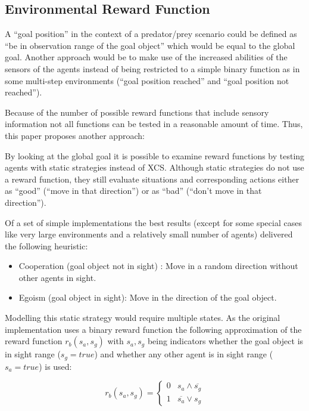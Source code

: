 \subsection{Environmental Reward Function}
\label{subsection:environment-reward-function}

A ``goal position'' in the context of a predator/prey scenario could be defined as ``be in observation range of the goal object'' which would be equal to the global goal. Another approach would be to make use of the increased abilities of the sensors of the agents instead of being restricted to a simple binary function as in some multi-step environments (``goal position reached'' and ``goal position not reached''). 

Because of the number of possible reward functions that include sensory information not all functions can be tested in a reasonable amount of time. Thus, this paper proposes another approach:

By looking at the global goal it is possible to examine reward functions by testing agents with static strategies instead of XCS. Although static strategies do not use a reward function, they still evaluate situations and corresponding actions either as ``good'' (``move in that direction'') or as ``bad'' (``don't move in that direction'').

Of a set of simple implementations the best results (except for some special cases like very large environments and a relatively small number of agents) delivered the following heuristic:

\begin{itemize}
	\item Cooperation (goal object not in sight) : Move in a random direction without other agents in sight.
	\item Egoism (goal object in sight): Move in the direction of the goal object.
\end{itemize}

Modelling this static strategy would require multiple states. As the original implementation uses a binary reward function the following approximation of the reward function $r_{b}(s_{a}, s_{g})$ with $s_{a}, s_{g}$ being indicators whether the goal object is in sight range ($s_{g} = true$) and whether any other agent is in sight range ($s_{a} = true$) is used:

$$
r_{b}(s_{a}, s_{g}) = \left\{ \begin{array}{rl}
  0 & s_{a} \wedge \overline{s_{g}} \\
  1 & \overline{s_{a}} \vee s_{g}
       \end{array} \right.
$$

